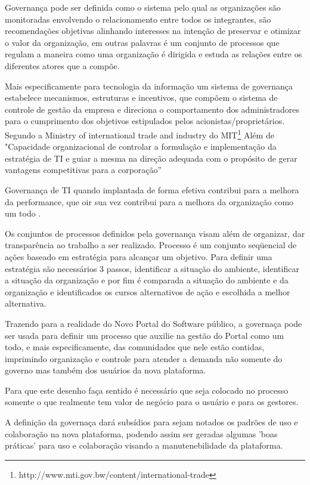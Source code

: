 Governança pode ser definida como o sistema pelo qual as organizações 
são monitoradas envolvendo o relacionamento entre todos os integrantes,
são recomendações objetivas alinhando interesses na intenção de preservar e 
otimizar o valor da organização, em outras palavras é um conjunto de processos
que regulam a maneira como uma organização é dirigida e estuda as relações entre 
os diferentes atores que a compõe.\cite{molinarogestao}

Mais especificamente para tecnologia da informação um sistema de governança
estabelece mecanismos, estruturas e incentivos, que compõem o sistema de controle de 
gestão da empresa e direciona o comportamento dos administradores para o cumprimento 
dos objetivos estipulados pelos acionistas/proprietários.\cite{martin2004governancca}
%
Segundo a Ministry of international trade and industry do MIT\footnote{http://www.mti.gov.bw/content/international-trade} 
Além de "Capacidade organizacional de controlar a formulação e implementação da 
estratégia de TI e guiar a mesma na direção adequada com o propósito de gerar 
vantagens competitivas para a corporação”

Governança de TI quando implantada de forma efetiva contribui para a melhora da 
performance, que oir sua vez contribui para a melhora da organização como um todo
\cite{tres2014information}.

Os conjuntos de processos definidos pela governança visam além de organizar, 
dar transparência ao trabalho a ser realizado.
%
Processo é um conjunto seqüencial de ações baseado em estratégia para alcançar
um objetivo. Para definir uma estratégia são necessários 3 passos, identificar a
situação do ambiente, identificar a situação da organização e por fim é comparada
a situação do ambiente e da organização e identificados os cursos alternativos
de ação e escolhida a melhor alternativa.\cite{molinarogestao}

Trazendo para a realidade do Novo Portal do Software público, a governaça pode ser usada para 
definir um processo que auxilie na gestão do Portal como um todo, e mais especificamente,
das comunidades que nele estão contidas, imprimindo organização e controle para atender 
a demanda não somente do governo mas também dos usuários da nova plataforma.

Para que este desenho faça sentido é necessário que seja colocado no processo somente o que 
realmente tem valor de negócio para o usuário e para os gestores.

A definição da governaça dará subsídios para sejam notados os padrões de uso e colaboração na
nova plataforma, podendo assim ser geradas algumas 'boas práticas' para uso e colaboração
visando a manutenebilidade da plataforma.

